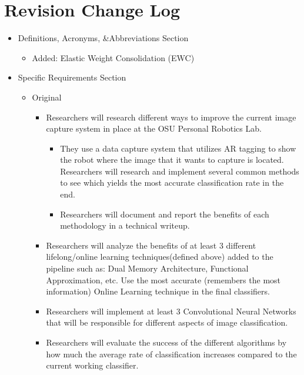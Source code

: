 \documentclass[draftclsnofoot, onecolumn, 10pt, compsoc]{IEEEtran}
\begin{document}
\section{Revision Change Log}
	\begin{itemize}
		\item Definitions, Acronyms, \&Abbreviations Section
			\begin{itemize}
				\item Added: Elastic Weight Consolidation (EWC)
			\end{itemize}
		
		\item Specific Requirements Section
			\begin{itemize}
				\item Original
					\begin{itemize}
						\item Researchers will research different ways to improve the current image capture system in place at the OSU Personal Robotics Lab. 
						
							\begin{itemize}
								\item They use a data capture system that utilizes AR tagging to show the robot where the image that it wants to capture is located. Researchers will research and implement several common methods to see which yields the most accurate classification rate in the end. 
								\item Researchers will document and report the benefits of each methodology in a technical writeup.
							\end{itemize}
						
						\item Researchers will analyze the benefits of at least 3 different lifelong/online learning techniques(defined above) added to the pipeline such as: Dual Memory Architecture, Functional Approximation, etc. Use the most accurate (remembers the most information) Online Learning technique in the final classifiers.
						
						\item Researchers will implement at least 3 Convolutional Neural Networks that will be responsible for different aspects of image classification. 
						
						\item Researchers will evaluate the success of the different algorithms by how much the average rate of classification increases compared to the current working classifier.
						

\end{itemize}
\end{itemize}
\end{itemize}
\end{document}
